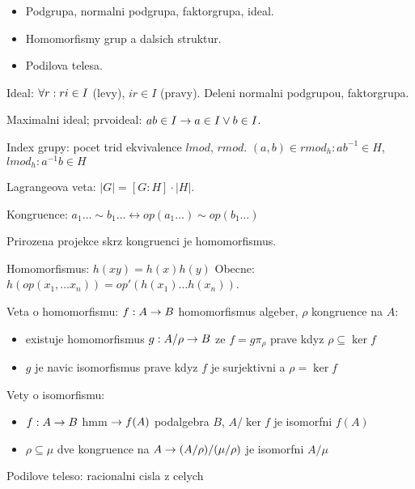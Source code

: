 \begin{itemize}
\item Podgrupa, normalni podgrupa, faktorgrupa, ideal.
\item Homomorfismy grup a dalsich struktur.
\item Podilova telesa.
\end{itemize}

Ideal: $\forall r: ri\in I$ (levy), $ir\in I$ (pravy). Deleni normalni podgrupou,
faktorgrupa.

Maximalni ideal; prvoideal: $ab\in I\rightarrow a\in I\vee b\in I$.

Index grupy: pocet trid ekvivalence $lmod$, $rmod$.
$(a,b)\in rmod_h: ab^{-1}\in H$, $lmod_h: a^{-1}b\in H$

Lagrangeova veta: $|G|=[G:H]\cdot |H|$.

Kongruence: $a_1\ldots\sim b_1\ldots \leftrightarrow op(a_1\ldots)\sim
op(b_1\ldots)$

Prirozena projekce skrz kongruenci je homomorfismus.

Homomorfismus: $h(xy)=h(x)h(y)$
Obecne: $h(op(x_1,\ldots x_n))=op'(h(x_1)\ldots h(x_n))$.

Veta o homomorfismu: $f:A\rightarrow B$ homomorfismus algeber, $\rho$ kongruence na $A$:
\begin{itemize}
\item existuje homomorfismus $g:A/\rho\rightarrow B$ ze $f=g\pi_\rho$ prave kdyz
$\rho\subseteq\ker f$
\item $g$ je navic isomorfismus prave kdyz $f$ je surjektivni a $\rho=\ker f$
\end{itemize}

Vety o isomorfismu:
\begin{itemize}
\item $f:A\rightarrow B$ hmm $\rightarrow f(A)$ podalgebra $B$, $A/\ker f$ je isomorfni $f(A)$
\item $\rho\subseteq\mu$ dve kongruence na $A\rightarrow (A/\rho)/(\mu/\rho)$ je
isomorfni $A/\mu$
\end{itemize}

Podilove teleso: racionalni cisla z celych
